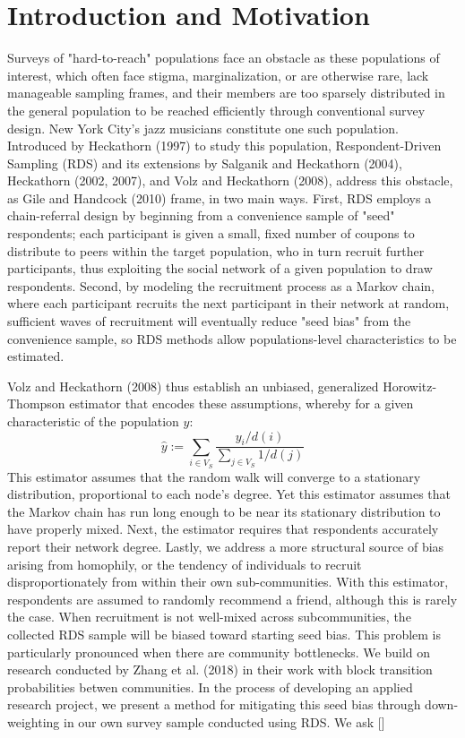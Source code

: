 \documentclass[12pt]{article}
\begin{document}
\section{Introduction and Motivation}

Surveys of "hard-to-reach" populations face an obstacle as these populations of interest, which often face stigma, marginalization, or are otherwise rare, lack manageable sampling frames, and their members are too sparsely distributed in the general population to be reached efficiently through conventional survey design. New York City's jazz musicians constitute one such population. Introduced by Heckathorn (1997) to study this population, Respondent-Driven Sampling (RDS) and its extensions by Salganik and Heckathorn (2004), Heckathorn (2002, 2007), and Volz and Heckathorn (2008), address this obstacle, as Gile and Handcock (2010) frame, in two main ways. First, RDS employs a chain-referral design by beginning from a convenience sample of "seed" respondents; each participant is given a small, fixed number of coupons to distribute to peers within the target population, who in turn recruit further participants, thus exploiting the social network of a given population to draw respondents. Second, by modeling the recruitment process as a Markov chain, where each participant recruits the next participant in their network at random, sufficient waves of recruitment will eventually reduce "seed bias" from the convenience sample, so RDS methods allow populations-level characteristics to be estimated. 

Volz and Heckathorn (2008) thus establish an unbiased, generalized Horowitz-Thompson estimator that encodes these assumptions, whereby for a given characteristic of the population $y$:
$$\hat{y} := \sum_{i\in V_S} \frac{y_i/d(i)}{\sum_{j\in V_S}1/d(j)}$$
This estimator assumes that the random walk will converge to a stationary distribution, proportional to each node's degree. Yet this estimator assumes that the Markov chain has run long enough to be near its stationary distribution to have properly mixed. Next, the estimator requires that respondents accurately report their network degree. Lastly, we address a more structural source of bias arising from homophily, or the tendency of individuals to recruit disproportionately from within their own sub-communities. With this estimator, respondents are assumed to randomly recommend a friend, although this is rarely the case. When recruitment is not well-mixed across subcommunities, the collected RDS sample will be biased toward starting seed bias. This problem is particularly pronounced when there are community bottlenecks. We build on research conducted by Zhang et al. (2018) in their work with block transition probabilities betwen communities. In the process of developing an applied research project, we present a method for mitigating this seed bias through down-weighting in our own survey sample conducted using RDS. We ask [] 
\end{document}
